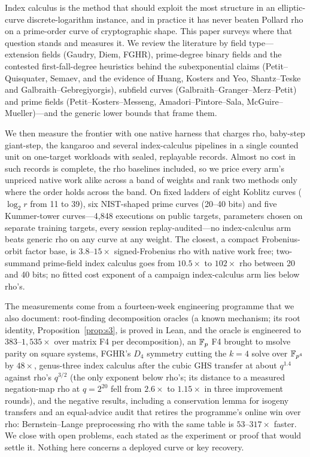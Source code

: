 Index calculus is the method that should exploit the most structure in an
elliptic-curve discrete-logarithm instance, and in practice it has never
beaten Pollard rho on a prime-order curve of cryptographic shape. This
paper surveys where that question stands and measures it. We review the
literature by field type---extension fields (Gaudry, Diem, FGHR), prime-degree
binary fields and the contested first-fall-degree heuristics behind the
subexponential claims (Petit--Quisquater, Semaev, and the evidence of Huang,
Kosters and Yeo, Shantz--Teske and Galbraith--Gebregiyorgis), subfield curves
(Galbraith--Granger--Merz--Petit) and prime fields (Petit--Kosters--Messeng,
Amadori--Pintore--Sala, McGuire--Mueller)---and the generic lower bounds that
frame them.

We then measure the frontier with one native harness that charges rho,
baby-step giant-step, the kangaroo and several index-calculus pipelines in a
single counted unit on one-target workloads with sealed, replayable records.
Almost no cost in such records is complete, the rho baselines included, so we
price every arm's unpriced native work alike across a band of weights and rank
two methods only where the order holds across the band. On fixed ladders of
eight Koblitz curves ($\log_2 r$ from 11 to 39), six NIST-shaped prime curves
(20--40 bits) and five Kummer-tower curves---4{,}848 executions on public
targets, parameters chosen on separate training targets, every session
replay-audited---no index-calculus arm beats generic rho on any curve at any
weight. The closest, a compact Frobenius-orbit factor base, is $3.8$--$15\times$
signed-Frobenius rho with native work free; two-summand prime-field index
calculus goes from $10.5\times$ to $102\times$ rho between 20 and 40 bits; no
fitted cost exponent of a campaign index-calculus arm lies below rho's.

The measurements come from a fourteen-week engineering programme that we also
document: root-finding decomposition oracles (a known mechanism; its root
identity, Proposition~\ref{prop:s3}, is proved in Lean, and the oracle is
engineered to $383$--$1{,}535\times$ over matrix F4 per decomposition),
an $\mathbb{F}_p$ F4 brought to msolve parity on square systems, FGHR's $D_4$ symmetry cutting the
$k=4$ solve over $\mathbb{F}_{p^4}$ by $48\times$, genus-three index calculus after the cubic GHS transfer at
about $q^{1.4}$ against rho's $q^{3/2}$ (the only exponent below rho's; its
distance to a measured negation-map rho at $q=2^{20}$ fell from $2.6\times$
to $1.15\times$ in three improvement rounds), and the negative results, including a
conservation lemma for isogeny transfers and an equal-advice audit that
retires the programme's online win over rho: Bernstein--Lange
preprocessing rho with the same table is $53$--$317\times$ faster. We close with open problems, each
stated as the experiment or proof that would settle it. Nothing here concerns a
deployed curve or key recovery.
